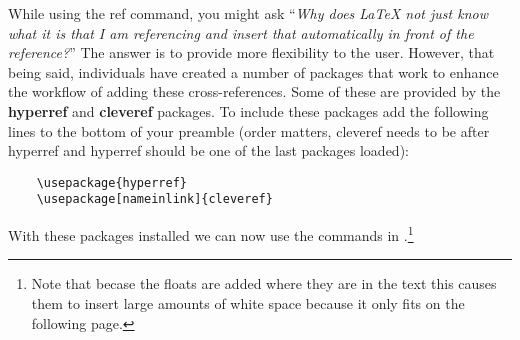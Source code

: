       While using the ref command, you might ask ``\textit{Why does \LaTeX{} not just know what it is that I am referencing and insert that automatically in front of the reference?}''
      The answer is to provide more flexibility to the user.
      However, that being said, individuals have created a number of packages that work to enhance the workflow of adding these cross-references.
      Some of these are provided by the \textbf{hyperref} and \textbf{cleveref} packages.
      To include these packages add the following lines to the bottom of your preamble (order matters, cleveref needs to be after hyperref and hyperref should be one of the last packages loaded):
      \begin{verbatim}
    \usepackage{hyperref}
    \usepackage[nameinlink]{cleveref}\end{verbatim}
      With these packages installed we can now use the commands in .\footnote{Note that becase the floats are added where they are in the text this causes them to insert large amounts of white space because it only fits on the following page.}
